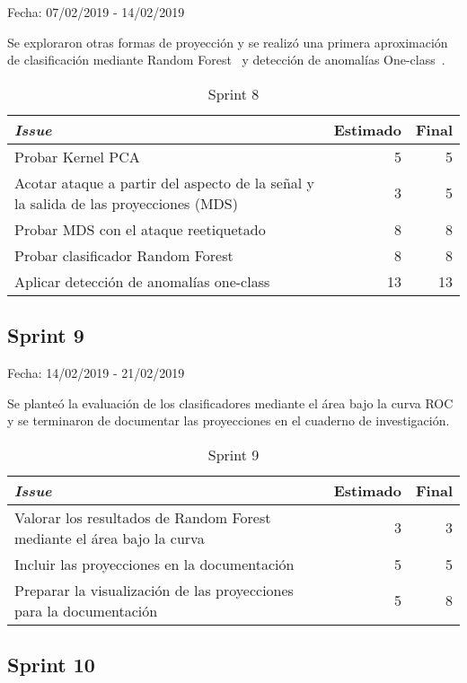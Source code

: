 Fecha: 07/02/2019 - 14/02/2019

Se exploraron otras formas de proyección y se realizó una primera aproximación de clasificación mediante Random Forest~\cite{RandomForest} y detección de anomalías One-class~\cite{OneClass}. 

\begin{table}[H]
	\begin{tabularx}{\textwidth}{Xrr}
		\toprule \textbf{\textit{Issue}} & \textbf{Estimado} & \textbf{Final}\\
		\toprule 
		Probar Kernel PCA & 5 & 5 \\
		Acotar ataque a partir del aspecto de la señal y la salida de las proyecciones (MDS) & 3 & 5 \\
		Probar MDS con el ataque reetiquetado & 8 & 8 \\
		Probar clasificador Random Forest & 8 & 8 \\
		Aplicar detección de anomalías one-class & 13 & 13 \\
		\bottomrule
	\end{tabularx}
	\caption{Sprint 8}
\end{table}


\subsection{Sprint 9}

Fecha: 14/02/2019 - 21/02/2019

Se planteó la evaluación de los clasificadores mediante el área bajo la curva ROC y se terminaron de documentar las proyecciones en el cuaderno de investigación. 

\begin{table}[H]
	\begin{tabularx}{\textwidth}{Xrr}
		\toprule \textbf{\textit{Issue}} & \textbf{Estimado} & \textbf{Final}\\
		\toprule 
		Valorar los resultados de Random Forest mediante el área bajo la curva & 3 & 3 \\
		Incluir las proyecciones en la documentación & 5 & 5 \\
		Preparar la visualización de las proyecciones para la documentación & 5 & 8 \\
		\bottomrule
	\end{tabularx}
	\caption{Sprint 9}
\end{table}

\subsection{Sprint 10}

